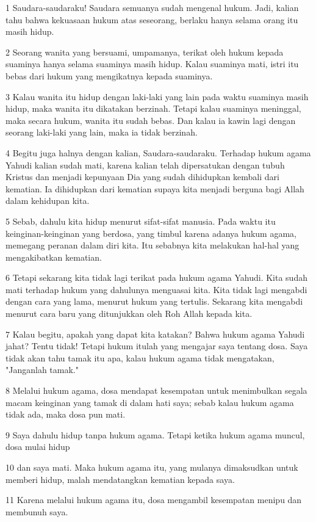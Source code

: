 \par 1 Saudara-saudaraku! Saudara semuanya sudah mengenal hukum. Jadi, kalian tahu bahwa kekuasaan hukum atas seseorang, berlaku hanya selama orang itu masih hidup.
\par 2 Seorang wanita yang bersuami, umpamanya, terikat oleh hukum kepada suaminya hanya selama suaminya masih hidup. Kalau suaminya mati, istri itu bebas dari hukum yang mengikatnya kepada suaminya.
\par 3 Kalau wanita itu hidup dengan laki-laki yang lain pada waktu suaminya masih hidup, maka wanita itu dikatakan berzinah. Tetapi kalau suaminya meninggal, maka secara hukum, wanita itu sudah bebas. Dan kalau ia kawin lagi dengan seorang laki-laki yang lain, maka ia tidak berzinah.
\par 4 Begitu juga halnya dengan kalian, Saudara-saudaraku. Terhadap hukum agama Yahudi kalian sudah mati, karena kalian telah dipersatukan dengan tubuh Kristus dan menjadi kepunyaan Dia yang sudah dihidupkan kembali dari kematian. Ia dihidupkan dari kematian supaya kita menjadi berguna bagi Allah dalam kehidupan kita.
\par 5 Sebab, dahulu kita hidup menurut sifat-sifat manusia. Pada waktu itu keinginan-keinginan yang berdosa, yang timbul karena adanya hukum agama, memegang peranan dalam diri kita. Itu sebabnya kita melakukan hal-hal yang mengakibatkan kematian.
\par 6 Tetapi sekarang kita tidak lagi terikat pada hukum agama Yahudi. Kita sudah mati terhadap hukum yang dahulunya menguasai kita. Kita tidak lagi mengabdi dengan cara yang lama, menurut hukum yang tertulis. Sekarang kita mengabdi menurut cara baru yang ditunjukkan oleh Roh Allah kepada kita.
\par 7 Kalau begitu, apakah yang dapat kita katakan? Bahwa hukum agama Yahudi jahat? Tentu tidak! Tetapi hukum itulah yang mengajar saya tentang dosa. Saya tidak akan tahu tamak itu apa, kalau hukum agama tidak mengatakan, "Janganlah tamak."
\par 8 Melalui hukum agama, dosa mendapat kesempatan untuk menimbulkan segala macam keinginan yang tamak di dalam hati saya; sebab kalau hukum agama tidak ada, maka dosa pun mati.
\par 9 Saya dahulu hidup tanpa hukum agama. Tetapi ketika hukum agama muncul, dosa mulai hidup
\par 10 dan saya mati. Maka hukum agama itu, yang mulanya dimaksudkan untuk memberi hidup, malah mendatangkan kematian kepada saya.
\par 11 Karena melalui hukum agama itu, dosa mengambil kesempatan menipu dan membunuh saya.
